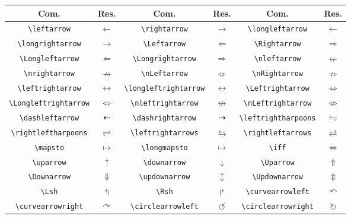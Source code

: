% 
% 
% 
% 
% 
\begin{tabular}{cc|cc|cc}
    \hline
    Com. & Res. & Com. & Res. & Com. & Res. \\ \hline
    \lstinline!\leftarrow! & $\leftarrow$ & \lstinline!\rightarrow! & $\rightarrow$ & \lstinline!\longleftarrow! & $\longleftarrow$ \\
    \lstinline!\longrightarrow! & $\longrightarrow$ & \lstinline!\Leftarrow! & $\Leftarrow$ & \lstinline!\Rightarrow! & $\Rightarrow$ \\
    \lstinline!\Longleftarrow! & $\Longleftarrow$ & \lstinline!\Longrightarrow! & $\Longrightarrow$ & \lstinline!\nleftarrow! & $\nleftarrow$ \\
    \lstinline!\nrightarrow! & $\nrightarrow$ & \lstinline!\nLeftarrow! & $\nLeftarrow$ & \lstinline!\nRightarrow! & $\nRightarrow$ \\
    \lstinline!\leftrightarrow! & $\leftrightarrow$ & \lstinline!\longleftrightarrow! & $\longleftrightarrow$ & \lstinline!\Leftrightarrow! & $\Leftrightarrow$ \\
    \lstinline!\Longleftrightarrow! & $\Longleftrightarrow$ & \lstinline!\nleftrightarrow! & $\nleftrightarrow$ & \lstinline!\nLeftrightarrow! & $\nLeftrightarrow$ \\
    \lstinline!\dashleftarrow! & $\dashleftarrow$ & \lstinline!\dashrightarrow! & $\dashrightarrow$ & \lstinline!\leftrightharpoons! & $\leftrightharpoons$ \\
    \lstinline!\rightleftharpoons! & $\rightleftharpoons$ & \lstinline!\leftrightarrows! & $\leftrightarrows$ & \lstinline!\rightleftarrows! & $\rightleftarrows$ \\
    \lstinline!\mapsto! & $\mapsto$ & \lstinline!\longmapsto! & $\longmapsto$ & \lstinline!\iff! & $\iff$ \\
    \lstinline!\uparrow! & $\uparrow$ & \lstinline!\downarrow! & $\downarrow$ & \lstinline!\Uparrow! & $\Uparrow$ \\
    \lstinline!\Downarrow! & $\Downarrow$ & \lstinline!\updownarrow! & $\updownarrow$ & \lstinline!\Updownarrow! & $\Updownarrow$ \\
    \lstinline!\Lsh! & $\Lsh$ & \lstinline!\Rsh! & $\Rsh$ & \lstinline!\curvearrowleft! & $\curvearrowleft$ \\
    \lstinline!\curvearrowright! & $\curvearrowright$ & \lstinline!\circlearrowleft! & $\circlearrowleft$ & \lstinline!\circlearrowright! & $\circlearrowright$ \\ \hline
\end{tabular}
